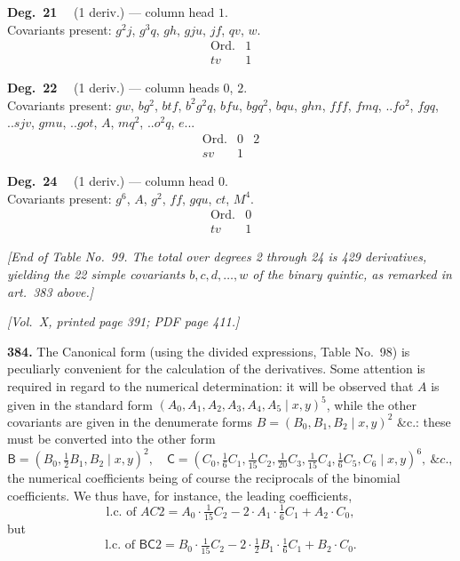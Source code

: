 \documentclass[11pt]{article}
\begin{document}
\bigskip

\noindent\textbf{Deg.~21} \ \ (1 deriv.) --- column head $1$. \\
Covariants present: $g^{2}j$, $g^{3}q$, $gh$, $gju$, $jf$, $qv$, $w$.
\[
\begin{array}{l|c}
\text{Ord.} & 1 \\\hline
tv & 1
\end{array}
\]

\bigskip

\noindent\textbf{Deg.~22} \ \ (1 deriv.) --- column heads $0$, $2$. \\
Covariants present: $gw$, $bg^{2}$, $btf$, $b^{2}g^{2}q$, $bfu$, $bgq^{2}$, $bqu$, $ghn$, $fff$, $fmq$, $..fo^{2}$, $fgq$, $..sjv$, $gmu$, $..got$, $A$, $mq^{2}$, $..o^{2}q$, $e..$.
\[
\begin{array}{l|cc}
\text{Ord.} & 0 & 2 \\\hline
sv & 1 &
\end{array}
\]

\bigskip

\noindent\textbf{Deg.~24} \ \ (1 deriv.) --- column head $0$. \\
Covariants present: $g^{6}$, $A$, $g^{2}$, $ff$, $gqu$, $ct$, $M^{4}$.
\[
\begin{array}{l|c}
\text{Ord.} & 0 \\\hline
tv & 1
\end{array}
\]

\bigskip
\bigskip

\noindent\textit{[End of Table No.~99. The total over degrees 2 through 24 is 429 derivatives, yielding the 22 simple covariants $b, c, d, \ldots, w$ of the binary quintic, as remarked in art.~383 above.]}

\newpage

\noindent\textit{[Vol.~X, printed page 391; PDF page 411.]}

\bigskip

\noindent\textbf{384.} The Canonical form (using the divided expressions, Table No.~98) is peculiarly convenient for the calculation of the derivatives. Some attention is required in regard to the numerical determination: it will be observed that $A$ is given in the standard form $(A_{0}, A_{1}, A_{2}, A_{3}, A_{4}, A_{5} \mid x, y)^{5}$, while the other covariants are given in the denumerate forms $B = (B_{0}, B_{1}, B_{2} \mid x, y)^{2}$ \&c.: these must be converted into the other form
\[
\mathsf{B} = (B_{0}, \tfrac{1}{2}B_{1}, B_{2} \mid x, y)^{2}, \quad
\mathsf{C} = (C_{0}, \tfrac{1}{6}C_{1}, \tfrac{1}{15}C_{2}, \tfrac{1}{20}C_{3}, \tfrac{1}{15}C_{4}, \tfrac{1}{6}C_{5}, C_{6} \mid x, y)^{6}, \ \&c.,
\]
the numerical coefficients being of course the reciprocals of the binomial coefficients. We thus have, for instance, the leading coefficients,
\[
\text{l.c.\ of } AC2 = A_{0}\cdot\tfrac{1}{15}C_{2} - 2\cdot A_{1}\cdot\tfrac{1}{6}C_{1} + A_{2}\cdot C_{0},
\]
but
\[
\text{l.c.\ of } \mathsf{BC}2 = B_{0}\cdot\tfrac{1}{15}C_{2} - 2\cdot\tfrac{1}{2}B_{1}\cdot\tfrac{1}{6}C_{1} + B_{2}\cdot C_{0}.
\]
\end{document}
